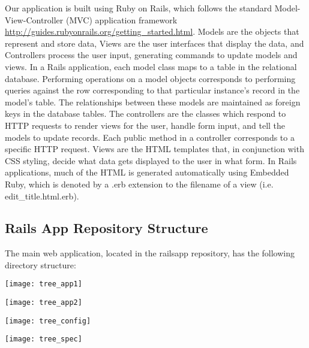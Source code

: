 \documentclass[12pt,letterpaper,titlepage]{article}
\begin{document}
Our application is built using Ruby on Rails, which follows the standard Model-View-Controller (MVC) application framework \url{http://guides.rubyonrails.org/getting\_started.html}. Models are the objects that represent and store data, Views are the user interfaces that display the data, and Controllers process the user input, generating commands to update models and views. 
In a Rails application, each model class maps to a table in the relational database. Performing operations on a model objects corresponds to performing queries against the row corresponding to that particular instance’s record in the model’s table. The relationships between these models are maintained as foreign keys in the database tables.
The controllers are the classes which respond to HTTP requests to render views for the user, handle form input, and tell the models to update records. Each public method in a controller corresponds to a specific HTTP request. Views are the HTML templates that, in conjunction with CSS styling, decide what data gets displayed to the user in what form. In Rails applications, much of the HTML is generated automatically using Embedded Ruby, which is denoted by a .erb extension to the filename of a view (i.e. edit\_title.html.erb).

\subsection{Rails App Repository Structure} \label{doc:RailsAppRepositoryStructure}

The main web application, located in the railsapp repository, has the following directory structure:

\begin{centering}
  \texttt{[image: tree\_app1]}
\end{centering} 

\begin{centering}
  \texttt{[image: tree\_app2]}
\end{centering} 

\begin{centering}
  \texttt{[image: tree\_config]}
\end{centering} 

\begin{centering}
  \texttt{[image: tree\_spec]}
\end{centering} 
\end{document}
